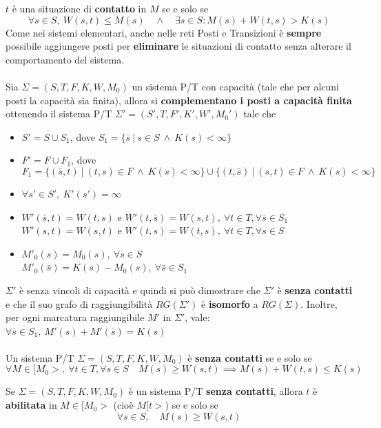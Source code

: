 $t$ è una situazione di \textbf{contatto} in $M$ se e solo se
\[
	\forall s \in S,
	\
	W(s, t) \leq M(s)
	\quad \wedge \quad
	\exists s \in S : M(s) + W(t, s) > K(s)
\]
Come nei sistemi elementari, anche nelle reti Posti e Transizioni è \textbf{sempre} possibile aggiungere posti per \textbf{eliminare} le situazioni di contatto senza alterare il comportamento del sistema.
\\
\\
Sia $\Sigma = (S, T, F, K, W, M_0)$ un sistema P/T con capacità (tale che per alcuni posti la capacità sia finita), allora si \textbf{complementano i posti a capacità finita} ottenendo il sistema P/T $\Sigma' = (S', T, F', K', W', M_0')$ tale che
\begin{itemize}
	\item $S'= S \cup S_1$, dove $S_1 = \{ \bar s \ | \ s \in S \ \wedge \ K(s) < \infty \}$
	\item $F'= F \cup F_1$, dove
	      \[
		      F_1 = \{ (\bar s, t) \ | \ (t, s) \in F \ \wedge \ K(s) < \infty\} \cup \{ (t, \bar s) \ | \ (s, t) \in F \ \wedge \ K(s) < \infty \}
	      \]
	\item $\forall s' \in S', \ K'(s') = \infty$
	\item $W'(\bar s, t) = W(t, s)$ e $W'(t, \bar s) = W(s, t), \ \forall t \in T, \forall \bar s \in S_1$\\
	      $W'(s, t) = W(s, t)$ e $W'(t, s) = W(t, s), \ \forall t \in T, \forall s \in S$
	\item $M'_0(s) = M_0(s), \ \forall s \in S$\\
	      $M'_0(\bar s) = K(s) - M_0(s), \ \forall \bar s \in S_1$
\end{itemize}

\noindent
$\Sigma'$ è senza vincoli di capacità e quindi si può dimostrare che $\Sigma'$ è \textbf{senza contatti} e che il suo grafo di raggiungibilità $RG(\Sigma')$ è \textbf{isomorfo} a $RG(\Sigma)$. Inoltre, per ogni marcatura raggiungibile $M'$ in $\Sigma'$, vale: $\forall \bar s \in S_1, \ M'(s) + M'(\bar s)= K(s)$
\\
\\
Un sistema P/T $\Sigma = (S, T, F, K, W, M_0)$ è \textbf{senza contatti} se e solo se
\[
	\forall M \in [M_0>, \ \forall t \in T, \forall s \in S
	\quad
	M(s) \geq W(s, t) \implies M(s) + W(t, s) \leq K(s)
\]

Se $\Sigma = (S, T, F, K, W, M_0)$ è un sistema P/T \textbf{senza contatti}, allora $t$ è \textbf{abilitata} in $M \in [M_0>$ (cioè $M[t>$) se e solo se
\[
	\forall s \in S, \quad M(s) \geq W(s, t)
\]
